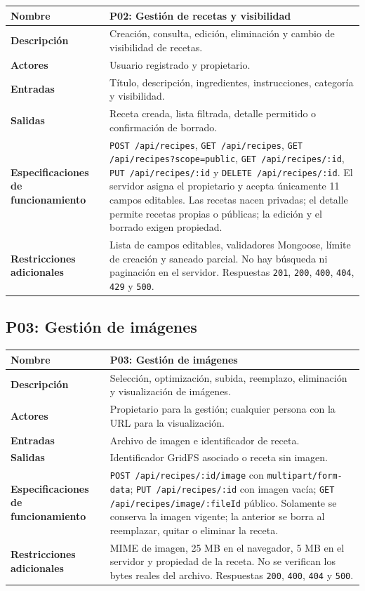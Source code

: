 \documentclass[doc,12pt,a4paper]{apa7}
\begin{document}
\begin{longtable}{|P{3.3cm}|L{11.2cm}|}
\hline
\textbf{Nombre} & P02: Gestión de recetas y visibilidad \\ \hline
\textbf{Descripción} & Creación, consulta, edición, eliminación y cambio de visibilidad de recetas. \\ \hline
\textbf{Actores} & Usuario registrado y propietario. \\ \hline
\textbf{Entradas} & Título, descripción, ingredientes, instrucciones, categoría y visibilidad. \\ \hline
\textbf{Salidas} & Receta creada, lista filtrada, detalle permitido o confirmación de borrado. \\ \hline
\textbf{Especificaciones de funcionamiento} & \texttt{POST /api/recipes}, \texttt{GET /api/recipes}, \texttt{GET /api/recipes?scope=public}, \texttt{GET /api/recipes/:id}, \texttt{PUT /api/recipes/:id} y \texttt{DELETE /api/recipes/:id}. El servidor asigna el propietario y acepta únicamente 11 campos editables. Las recetas nacen privadas; el detalle permite recetas propias o públicas; la edición y el borrado exigen propiedad. \\ \hline
\textbf{Restricciones adicionales} & Lista de campos editables, validadores Mongoose, límite de creación y saneado parcial. No hay búsqueda ni paginación en el servidor. Respuestas \texttt{201}, \texttt{200}, \texttt{400}, \texttt{404}, \texttt{429} y \texttt{500}. \\ \hline
\end{longtable}

\subsection{P03: Gestión de imágenes}

\begin{longtable}{|P{3.3cm}|L{11.2cm}|}
\hline
\textbf{Nombre} & P03: Gestión de imágenes \\ \hline
\textbf{Descripción} & Selección, optimización, subida, reemplazo, eliminación y visualización de imágenes. \\ \hline
\textbf{Actores} & Propietario para la gestión; cualquier persona con la URL para la visualización. \\ \hline
\textbf{Entradas} & Archivo de imagen e identificador de receta. \\ \hline
\textbf{Salidas} & Identificador GridFS asociado o receta sin imagen. \\ \hline
\textbf{Especificaciones de funcionamiento} & \texttt{POST /api/recipes/:id/image} con \texttt{multipart/form-data}; \texttt{PUT /api/recipes/:id} con imagen vacía; \texttt{GET /api/recipes/image/:fileId} público. Solamente se conserva la imagen vigente; la anterior se borra al reemplazar, quitar o eliminar la receta. \\ \hline
\textbf{Restricciones adicionales} & MIME de imagen, 25 MB en el navegador, 5 MB en el servidor y propiedad de la receta. No se verifican los bytes reales del archivo. Respuestas \texttt{200}, \texttt{400}, \texttt{404} y \texttt{500}. \\ \hline
\end{longtable}
\end{document}
